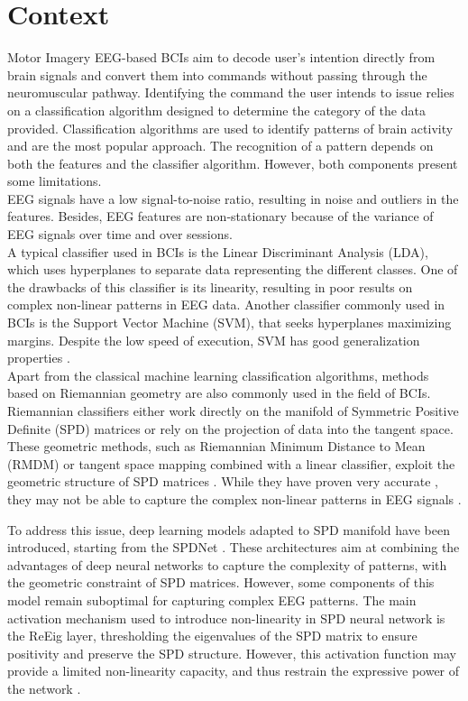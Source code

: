 \documentclass[11pt,a4paper]{article}
\begin{document}
\newpage
\section{Context}
Motor Imagery EEG-based BCIs aim to decode user's intention directly from brain signals and convert them into commands without passing through the neuromuscular pathway. Identifying the command the user intends to issue relies on a classification algorithm designed to determine the category of the data provided. Classification algorithms are used to identify patterns of brain activity and are the most popular approach. The recognition of a pattern depends on both the features and the classifier algorithm. However, both components present some limitations.\\
EEG signals have a low signal-to-noise ratio, resulting in noise and outliers in the features. Besides, EEG features are non-stationary because of the variance of EEG signals over time and over sessions. \\
A typical classifier used in BCIs is the Linear Discriminant Analysis (LDA), which uses hyperplanes to separate data representing the different classes. One of the drawbacks of this classifier is its linearity, resulting in poor results on complex non-linear patterns in EEG data. Another classifier commonly used in BCIs is the Support Vector Machine (SVM), that seeks hyperplanes maximizing margins. Despite the low speed of execution, SVM has good generalization properties \cite{limitation}.\\

Apart from the classical machine learning classification algorithms, methods based on Riemannian geometry are also commonly used in the field of BCIs. Riemannian classifiers either work directly on the manifold of Symmetric Positive Definite (SPD) matrices or rely on the projection of data into the tangent space. These geometric methods, such as Riemannian Minimum Distance to Mean (RMDM) or tangent space mapping combined with a linear classifier, exploit the geometric structure of SPD matrices \cite{marco2017}. While they have proven very accurate \cite{moabb}, they may not be able to capture the complex non-linear patterns in EEG signals \cite{limitation2}.

\noindent To address this issue, deep learning models adapted to SPD manifold have been introduced, starting from the SPDNet \cite{spdnet}. These architectures aim at combining the advantages of deep neural networks to capture the complexity of patterns, with the geometric constraint of SPD matrices. 
However, some components of this model remain suboptimal for capturing complex EEG patterns. The main activation mechanism used to introduce non-linearity in SPD neural network is the ReEig layer, thresholding the eigenvalues of the SPD matrix to ensure positivity and preserve the SPD structure. However, this activation function may provide a limited non-linearity capacity, and thus restrain the expressive power of the network \cite{act}. \\
\end{document}
